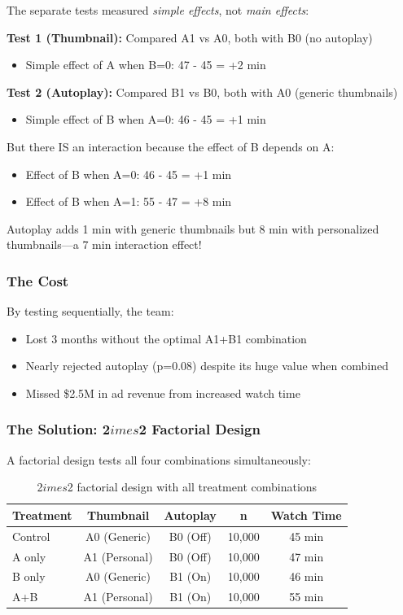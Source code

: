 The separate tests measured \textit{simple effects}, not \textit{main effects}:

\textbf{Test 1 (Thumbnail):} Compared A1 vs A0, both with B0 (no autoplay)
\begin{itemize}
    \item Simple effect of A when B=0: 47 - 45 = +2 min
\end{itemize}

\textbf{Test 2 (Autoplay):} Compared B1 vs B0, both with A0 (generic thumbnails)
\begin{itemize}
    \item Simple effect of B when A=0: 46 - 45 = +1 min
\end{itemize}

But there IS an interaction because the effect of B depends on A:
\begin{itemize}
    \item Effect of B when A=0: 46 - 45 = +1 min
    \item Effect of B when A=1: 55 - 47 = +8 min
\end{itemize}

Autoplay adds 1 min with generic thumbnails but 8 min with personalized thumbnails---a 7 min interaction effect!

\subsubsection{The Cost}

By testing sequentially, the team:
\begin{itemize}
    \item Lost 3 months without the optimal A1+B1 combination
    \item Nearly rejected autoplay (p=0.08) despite its huge value when combined
    \item Missed \$2.5M in ad revenue from increased watch time
\end{itemize}

\subsubsection{The Solution: 2$	imes$2 Factorial Design}

A factorial design tests all four combinations simultaneously:

\begin{table}[h]
\centering
\begin{tabular}{lcccc}
\toprule
\textbf{Treatment} & \textbf{Thumbnail} & \textbf{Autoplay} & \textbf{n} & \textbf{Watch Time} \\
\midrule
Control & A0 (Generic) & B0 (Off) & 10,000 & 45 min \\
A only & A1 (Personal) & B0 (Off) & 10,000 & 47 min \\
B only & A0 (Generic) & B1 (On) & 10,000 & 46 min \\
A+B & A1 (Personal) & B1 (On) & 10,000 & 55 min \\
\bottomrule
\end{tabular}
\caption{2$	imes$2 factorial design with all treatment combinations}
\end{table}

